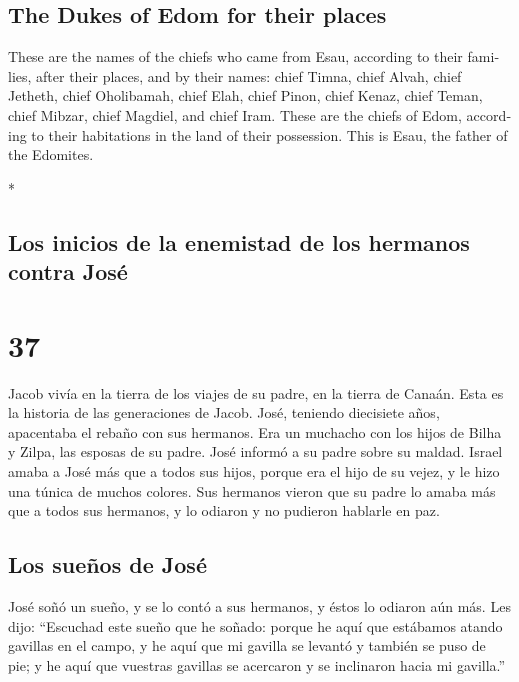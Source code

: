 \begin{paracol}{2}
\begin{otherlanguage}{english}
{\subsection{The Dukes of Edom for their
places}\label{the-dukes-of-edom-for-their-places}}

 These are the names of the chiefs who came from Esau,
according to their families, after their places, and by their names:
chief Timna, chief Alvah, chief Jetheth,  chief
Oholibamah, chief Elah, chief Pinon,  chief Kenaz, chief
Teman, chief Mibzar,  chief Magdiel, and chief Iram.
These are the chiefs of Edom, according to their habitations in the land
of their possession. This is Esau, the father of the Edomites.

\end{otherlanguage}

\switchcolumn[0]*

\hypertarget{los-inicios-de-la-enemistad-de-los-hermanos-contra-josuxe9}{%
\subsection{Los inicios de la enemistad de los hermanos contra
José}\label{los-inicios-de-la-enemistad-de-los-hermanos-contra-josuxe9}}

\hypertarget{section-72}{%
\section{37}\label{section-72}}

 Jacob vivía en la tierra de los viajes de su padre, en la
tierra de Canaán.  Esta es la historia de las generaciones
de Jacob. José, teniendo diecisiete años, apacentaba el rebaño con sus
hermanos. Era un muchacho con los hijos de Bilha y Zilpa, las esposas de
su padre. José informó a su padre sobre su maldad.  Israel
amaba a José más que a todos sus hijos, porque era el hijo de su vejez,
y le hizo una túnica de muchos colores.  Sus hermanos
vieron que su padre lo amaba más que a todos sus hermanos, y lo odiaron
y no pudieron hablarle en paz.

\hypertarget{los-sueuxf1os-de-josuxe9}{%
\subsection{Los sueños de José}\label{los-sueuxf1os-de-josuxe9}}

 José soñó un sueño, y se lo contó a sus hermanos, y éstos
lo odiaron aún más.  Les dijo: ``Escuchad este sueño que
he soñado:  porque he aquí que estábamos atando gavillas
en el campo, y he aquí que mi gavilla se levantó y también se puso de
pie; y he aquí que vuestras gavillas se acercaron y se inclinaron hacia
mi gavilla.''


\end{paracol}
